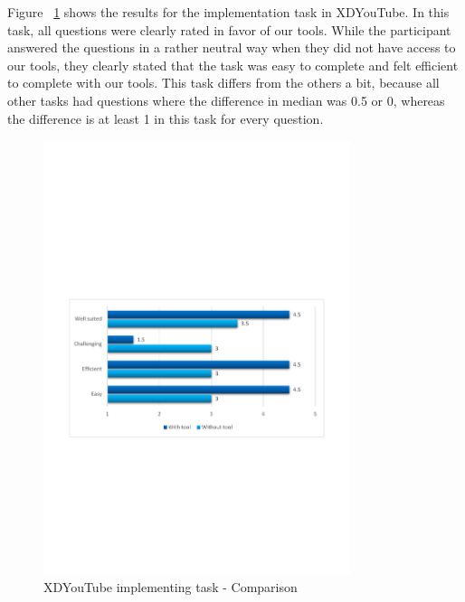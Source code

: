 Figure ~\ref{fig:xdyt_impl_comparison} shows the results for the implementation task in XDYouTube. In this task, all questions were clearly rated in favor of our tools. While the participant answered the questions in a rather neutral way when they did not have access to our tools, they clearly stated that the task was easy to complete and felt efficient to complete with our tools. This task differs from the others a bit, because all other tasks had questions where the difference in median was 0.5 or 0, whereas the difference is at least 1 in this task for every question.

\begin{figure}[H]
  \centering
    \includegraphics[width=0.8\textwidth]{images/charts/xdyt_impl_comparison.pdf}
	\caption{XDYouTube implementing task - Comparison}
	\label{fig:xdyt_impl_comparison}
\end{figure}

